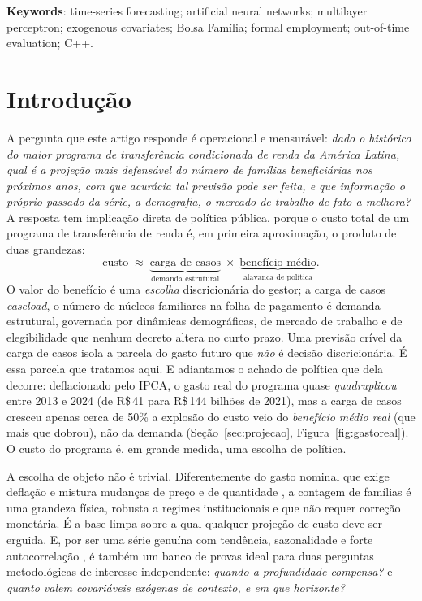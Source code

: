 \documentclass[12pt,a4paper,oneside]{article}
\begin{document}
\noindent\textbf{Keywords}: time-series forecasting; artificial neural
networks; multilayer perceptron; exogenous covariates; Bolsa Família;
formal employment; out-of-time evaluation; C++.

\newpage
\tableofcontents
\newpage

\section{Introdução}

A pergunta que este artigo responde é operacional e mensurável:
\emph{dado o histórico do maior programa de transferência condicionada de
renda da América Latina, qual é a projeção mais defensável do número de
famílias beneficiárias nos próximos anos, com que acurácia tal previsão
pode ser feita, e que informação \textemdash{} o próprio passado da série,
a demografia, o mercado de trabalho \textemdash{} de fato a melhora?} A
resposta tem implicação direta de política pública, porque o custo total
de um programa de transferência de renda é, em primeira aproximação, o
produto de duas grandezas:
\begin{equation}
\text{custo} \;\approx\; \underbrace{\text{carga de casos}}_{\text{demanda estrutural}}
\;\times\;
\underbrace{\text{benefício médio}}_{\text{alavanca de política}} .
\label{eq:custo}
\end{equation}
O valor do benefício é uma \emph{escolha} discricionária do gestor; a
carga de casos \textemdash{} \emph{caseload}, o número de núcleos
familiares na folha de pagamento \textemdash{} é demanda estrutural,
governada por dinâmicas demográficas, de mercado de trabalho e de
elegibilidade que nenhum decreto altera no curto prazo. Uma previsão
crível da carga de casos isola a parcela do gasto futuro que \emph{não} é
decisão discricionária. É essa parcela que tratamos aqui. E adiantamos o
achado de política que dela decorre: deflacionado pelo IPCA, o gasto real do
programa quase \emph{quadruplicou} entre 2013 e 2024 (de R\$\,41 para
R\$\,144 bilhões de 2021), mas a carga de casos cresceu apenas cerca de
50\% \textemdash{} a explosão do custo veio do \emph{benefício médio real}
(que mais que dobrou), não da demanda (Seção~\ref{sec:projecao},
Figura~\ref{fig:gastoreal}). O custo do programa é, em grande medida, uma
escolha de política.

A escolha de objeto não é trivial. Diferentemente do gasto nominal
\textemdash{} que exige deflação e mistura mudanças de preço e de
quantidade \textemdash{}, a contagem de famílias é uma grandeza física,
robusta a regimes institucionais e que não requer correção monetária. É a
base limpa sobre a qual qualquer projeção de custo deve ser erguida. E,
por ser uma série genuína \textemdash{} com tendência, sazonalidade e
forte autocorrelação \textemdash{}, é também um banco de provas ideal para
duas perguntas metodológicas de interesse independente: \emph{quando a
profundidade compensa?} e \emph{quanto valem covariáveis exógenas de
contexto, e em que horizonte?}
\end{document}
